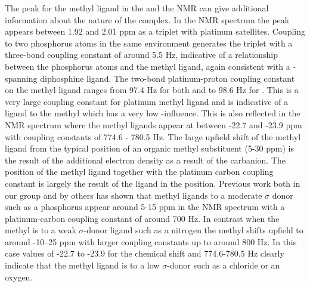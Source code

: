 The peak for the methyl ligand in the \proton{} and the \carbon{} NMR can give additional information about the nature of the complex.  In the \proton{} NMR spectrum the peak appears between 1.92 and 2.01 ppm as a triplet with platinum satellites.  Coupling to two phosphorus atoms in the same environment generates the triplet with a three-bond coupling constant of around 5.5 Hz, indicative of a \cis{} relationship between the phosphorus atoms and the methyl ligand, again consistent with a \trans-spanning diphosphine ligand.  The two-bond platinum-proton coupling constant on the methyl ligand ranges from 97.4 Hz for both \tBuxantphos{} and \tButhixantphos{} to 98.6 Hz for \tBusixantphos.  This is a very large coupling constant for platinum methyl ligand and is indicative of a ligand \trans{} to the methyl which has a very low \trans{}-influence.  This is also reflected in the \carbon{} NMR spectrum where the methyl ligands appear at between -22.7 and -23.9 ppm with coupling constants of 774.6 - 780.5 Hz.  The large upfield shift of the methyl ligand from the typical position of an organic methyl substituent (5-30 ppm\cite{Silverstein2005}) is the result of the additional electron density as a result of the carbanion.  The position of the methyl ligand together with the platinum carbon coupling constant is largely the result of the ligand in the \trans{} position.  Previous work both in our group\cite{Zayya2012, Zayya2012b} and by others\cite{Scollard2001}  has shown that methyl ligands \trans{} to a moderate $\sigma$ donor such as a phosphorus appear around 5-15 ppm in the \carbon{} NMR spectrum with a platinum-carbon coupling constant of around 700 Hz.  In contrast when the methyl is \trans{} to a weak $\sigma$-donor ligand such as a nitrogen the methyl shifts upfield to around -10--25 ppm with larger coupling constants up to around 800 Hz.  In this case values of -22.7 to -23.9 for the \carbon{} chemical shift and 774.6-780.5 Hz clearly indicate that the methyl ligand is \trans{} to a low $\sigma$-donor such as a chloride or an oxygen.  


